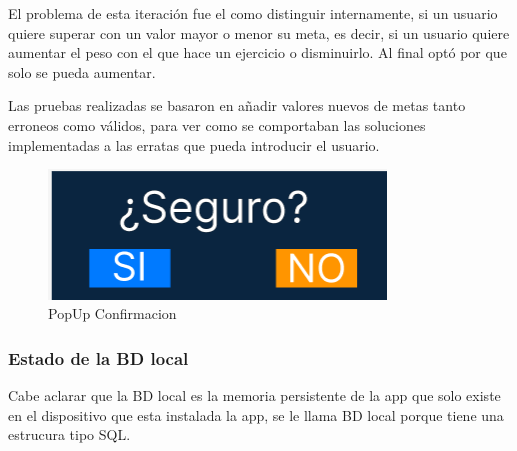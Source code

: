 El problema de esta iteración fue el como distinguir internamente, si un usuario quiere superar con un valor mayor o menor su meta, es decir, si un usuario quiere aumentar el peso con el que hace un ejercicio o disminuirlo. Al final optó por que solo se pueda aumentar.

Las pruebas realizadas se basaron en añadir valores nuevos de metas tanto erroneos como válidos, para ver como se comportaban las soluciones implementadas a las erratas que pueda introducir el usuario.


\begin{figure}[H]
   \centering
    \includegraphics[width=0.8\textwidth]{pantallas/PopUpConfirmacion.png}
    \caption{PopUp Confirmacion}
    \label{fig:PopUpConfirmacion}
\end{figure}

\subsubsection{Estado de la BD local}

Cabe aclarar que la BD local es la memoria persistente de la app que solo existe en el dispositivo que esta instalada la app, se le llama BD local porque tiene una estrucura tipo SQL.

